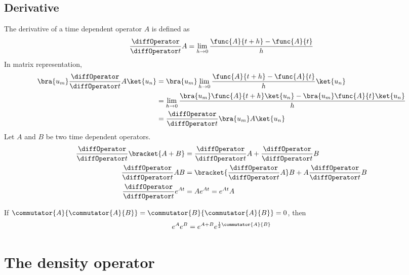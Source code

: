 \subsection{Derivative}
The derivative of a time dependent operator \(A\) is defined as 
\begin{equation*}
    \dfrac{\diffOperator}{\diffOperator t} A = \lim_{h \to 0} \dfrac{\func{A}{t+h} - \func{A}{t}}{h}
\end{equation*}
In matrix representation, 
\begin{align*}
    \bra{u_m}\dfrac{\diffOperator}{\diffOperator t} A \ket{u_n} &= \bra{u_m}\lim_{h \to 0} \dfrac{\func{A}{t+h} - \func{A}{t}}{h}\ket{u_n} \\
    &= \lim_{h \to 0} \dfrac{\bra{u_m}\func{A}{t+h}\ket{u_n} - \bra{u_m}\func{A}{t}\ket{u_n}}{h}\\
    &= \dfrac{\diffOperator}{\diffOperator t} \bra{u_m}A \ket{u_n}
\end{align*}
Let \(A\) and \(B\) be two time dependent operators.
\begin{align*}
    \dfrac{\diffOperator}{\diffOperator t} \bracket{A + B} & = \dfrac{\diffOperator}{\diffOperator t} A +  \dfrac{\diffOperator}{\diffOperator t} B            \\
    \dfrac{\diffOperator}{\diffOperator t}AB & = \bracket{\dfrac{\diffOperator}{\diffOperator t} A}B +  A\dfrac{\diffOperator}{\diffOperator t} B \\
    \dfrac{\diffOperator}{\diffOperator t} e^{At} & = A e^{At} = e^{At} A                                                                             
\end{align*}
\begin{proposition}
    If \(\commutator{A}{\commutator{A}{B}} = \commutator{B}{\commutator{A}{B}} = 0\), then
    \begin{equation*}
        e^A e^B = e^{A + B} e^{\frac{1}{2} \commutator{A}{B}}
    \end{equation*}
\end{proposition}
\section{The density operator}
